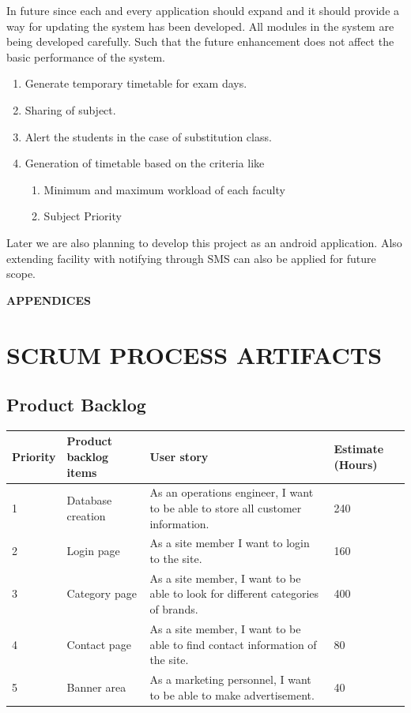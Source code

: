 In future since each and every application should expand and it should provide a way for updating the system has been developed. All modules in the system are being developed carefully. Such that the future enhancement does not affect the basic performance of the system.
\begin{enumerate}
 \item Generate temporary timetable for exam days.
\item Sharing of subject.
\item Alert the students in the case of substitution class.
\item Generation of timetable based on the criteria like
\begin{enumerate}
\item Minimum and maximum workload of each faculty
\item Subject Priority
\end{enumerate}
\end{enumerate}
Later we are also planning to develop this project as an android application. Also extending facility with notifying through SMS can also be applied for future scope.


%
%
%
%
\clearpage
{}
\appendix
\quad\vfill
\begin{center}
{\Huge \bf APPENDICES}
\end{center}
\vfill
\clearpage
%
%
%
%
\chapter{SCRUM PROCESS ARTIFACTS}
%
\section{Product Backlog}
%
%
\renewcommand{\arraystretch}{1.25}
\begin{center}
\begin{tabular}{|m{}|m{}|m{}|m{}|}
\hline
{\bf Priority} & {\bf Product backlog items} & {\bf User story} & {\bf Estimate (Hours)}\\
\hline
1 & Database creation & As an operations engineer, I want to be able to store all customer information.  & 240 \\
\hline
2 & Login page & As a site member I want to login to the site. & 160 \\
\hline
3 & Category page & As a site member, I want to be able to look for different categories of brands. & 400\\
\hline
4 & Contact page & As a site member, I want to be able to find contact information of the site. & 80 \\
\hline
5 & Banner area & As a marketing personnel, I want to be able to make advertisement. & 40\\
\hline
\end{tabular}
\end{center}
\renewcommand{\arraystretch}{1}
%
%
